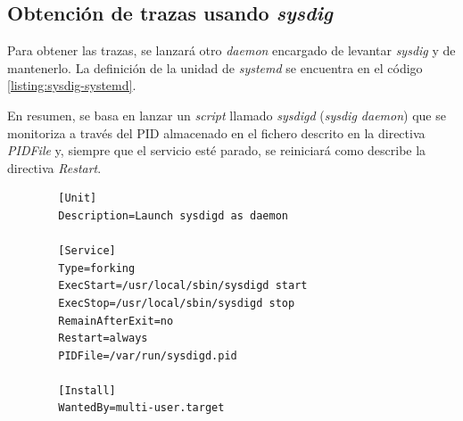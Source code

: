 \clearpage
\subsection{Obtención de trazas usando \emph{sysdig}}

Para obtener las trazas, se lanzará otro \emph{daemon} encargado de levantar \emph{sysdig} y de mantenerlo.
La definición de la unidad de \emph{systemd} se encuentra en el código \ref{listing:sysdig-systemd}. 

En resumen, se basa en lanzar un \emph{script} llamado \emph{sysdigd} (\emph{sysdig daemon}) que se monitoriza a través
del PID almacenado en el fichero descrito en la directiva \emph{PIDFile} y, siempre que el servicio
esté parado, se reiniciará como describe la directiva \emph{Restart}.

    \begin{verbatim}
        [Unit]
        Description=Launch sysdigd as daemon
        
        [Service]
        Type=forking
        ExecStart=/usr/local/sbin/sysdigd start
        ExecStop=/usr/local/sbin/sysdigd stop
        RemainAfterExit=no
        Restart=always
        PIDFile=/var/run/sysdigd.pid
        
        [Install]
        WantedBy=multi-user.target
    \end{verbatim}
\bigskip

